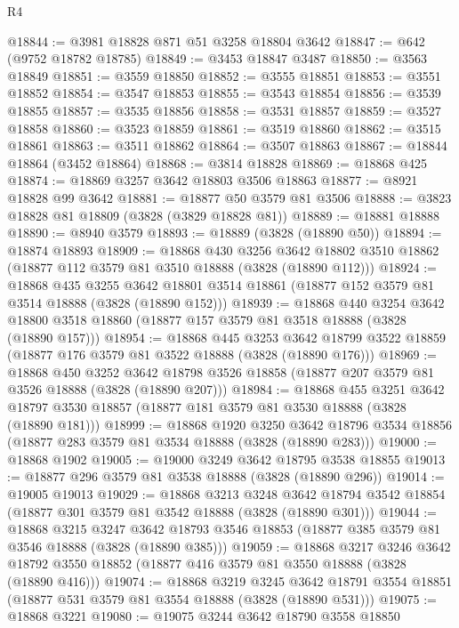 \begin{lexlean}{R4}
\begin{coremodule}
@18844 := @3981 @18828 @871 @51 @3258 @18804 @3642
@18847 := @642 (@9752 @18782 @18785)
@18849 := @3453 @18847 @3487
@18850 := @3563 @18849
@18851 := @3559 @18850
@18852 := @3555 @18851
@18853 := @3551 @18852
@18854 := @3547 @18853
@18855 := @3543 @18854
@18856 := @3539 @18855
@18857 := @3535 @18856
@18858 := @3531 @18857
@18859 := @3527 @18858
@18860 := @3523 @18859
@18861 := @3519 @18860
@18862 := @3515 @18861
@18863 := @3511 @18862
@18864 := @3507 @18863
@18867 := @18844 @18864 (@3452 @18864)
@18868 := @3814 @18828
@18869 := @18868 @425
@18874 := @18869 @3257 @3642 @18803 @3506 @18863
@18877 := @8921 @18828 @99 @3642
@18881 := @18877 @50 @3579 @81 @3506
@18888 := @3823 @18828 @81 @18809 (@3828 (@3829 @18828 @81))
@18889 := @18881 @18888
@18890 := @8940 @3579
@18893 := @18889 (@3828 (@18890 @50))
@18894 := @18874 @18893
@18909 := @18868
    @430
    @3256
    @3642
    @18802
    @3510
    @18862
    (@18877 @112 @3579 @81 @3510 @18888 (@3828 (@18890 @112)))
@18924 := @18868
    @435
    @3255
    @3642
    @18801
    @3514
    @18861
    (@18877 @152 @3579 @81 @3514 @18888 (@3828 (@18890 @152)))
@18939 := @18868
    @440
    @3254
    @3642
    @18800
    @3518
    @18860
    (@18877 @157 @3579 @81 @3518 @18888 (@3828 (@18890 @157)))
@18954 := @18868
    @445
    @3253
    @3642
    @18799
    @3522
    @18859
    (@18877 @176 @3579 @81 @3522 @18888 (@3828 (@18890 @176)))
@18969 := @18868
    @450
    @3252
    @3642
    @18798
    @3526
    @18858
    (@18877 @207 @3579 @81 @3526 @18888 (@3828 (@18890 @207)))
@18984 := @18868
    @455
    @3251
    @3642
    @18797
    @3530
    @18857
    (@18877 @181 @3579 @81 @3530 @18888 (@3828 (@18890 @181)))
@18999 := @18868
    @1920
    @3250
    @3642
    @18796
    @3534
    @18856
    (@18877 @283 @3579 @81 @3534 @18888 (@3828 (@18890 @283)))
@19000 := @18868 @1902
@19005 := @19000 @3249 @3642 @18795 @3538 @18855
@19013 := @18877 @296 @3579 @81 @3538 @18888 (@3828 (@18890 @296))
@19014 := @19005 @19013
@19029 := @18868
    @3213
    @3248
    @3642
    @18794
    @3542
    @18854
    (@18877 @301 @3579 @81 @3542 @18888 (@3828 (@18890 @301)))
@19044 := @18868
    @3215
    @3247
    @3642
    @18793
    @3546
    @18853
    (@18877 @385 @3579 @81 @3546 @18888 (@3828 (@18890 @385)))
@19059 := @18868
    @3217
    @3246
    @3642
    @18792
    @3550
    @18852
    (@18877 @416 @3579 @81 @3550 @18888 (@3828 (@18890 @416)))
@19074 := @18868
    @3219
    @3245
    @3642
    @18791
    @3554
    @18851
    (@18877 @531 @3579 @81 @3554 @18888 (@3828 (@18890 @531)))
@19075 := @18868 @3221
@19080 := @19075 @3244 @3642 @18790 @3558 @18850

\end{coremodule}
\end{lexlean}
